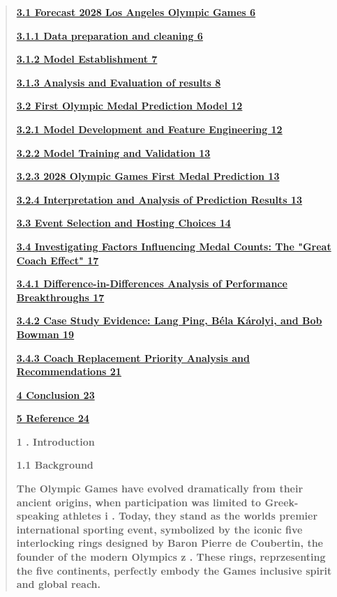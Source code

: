 \documentclass[12pt,a4paper]{article}
\renewenvironment{quote}{\begin{quotation}}{\end{quotation}}  %
\begin{document}
    \begin{quote}
    \hyperref[bookmark8-1]{\textbf{3.1 Forecast 2028 Los Angeles Olympic
    Games 6}}
    
    \hyperref[bookmark9-1]{\textbf{3.1.1 Data preparation and cleaning 6}}
    
    \hyperref[bookmark28]{\textbf{3.1.2 Model Establishment 7}}
    
    \hyperref[bookmark11-1]{\textbf{3.1.3 Analysis and Evaluation of results
    8}}
    
    \hyperref[bookmark12-1]{\textbf{3.2 First Olympic Medal Prediction Model
    12}}
    
    \hyperref[bookmark13-1]{\textbf{3.2.1 Model Development and Feature
    Engineering 12}}
    
    \hyperref[bookmark31]{\textbf{3.2.2 Model Training and Validation 13}}
    
    \hyperref[bookmark15-1]{\textbf{3.2.3 2028 Olympic Games First Medal
    Prediction 13}}
    
    \hyperref[bookmark16-1]{\textbf{3.2.4 Interpretation and Analysis of
    Prediction Results 13}}
    
    \hyperref[bookmark17-1]{\textbf{3.3 Event Selection and Hosting Choices
    14}}
    
    \protect{}\label{bookmark18}{}\hyperref[bookmark18]{\textbf{3.4
    Investigating Factors Influencing Medal Counts: The "Great Coach Effect"
    17}}
    
    \hyperref[bookmark19-1]{\textbf{3.4.1 Difference-in-Differences Analysis
    of Performance Breakthroughs 17}}
    
    \hyperref[bookmark20-1]{\textbf{3.4.2 Case Study Evidence: Lang Ping,
    Béla Károlyi, and Bob Bowman 19}}
    
    \hyperref[bookmark21-1]{\textbf{3.4.3 Coach Replacement Priority
    Analysis and Recommendations 21}}
    
    \hyperref[bookmark22-1]{\textbf{4 Conclusion 23}}
    
    \hyperref[bookmark23-1]{\textbf{5 Reference 24}}
    
    \protect{}\label{bookmark24}{}\textbf{1 . Introduction}
    
    \protect{}\label{bookmark3-1}{}\textbf{1.1 Background}
    
    \textbf{The Olympic Games have evolved dramatically from their ancient
    origins, when participation was limited to Greek-speaking athletes i .
    Today, they stand as the world\textquotesingle s premier international
    sporting event, symbolized by the iconic five interlocking rings
    designed by Baron Pierre de Coubertin, the founder of the modern
    Olympics z . These rings, reprzesenting the five continents, perfectly
    embody the Games\textquotesingle{} inclusive spirit and global reach.}
    

\end{quote}
\end{document}
